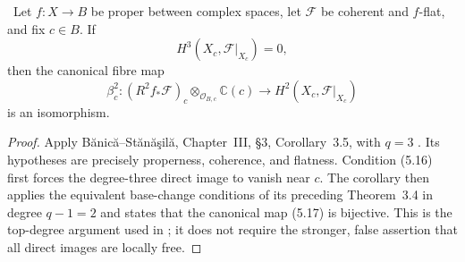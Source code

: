 \begin{proposition}
\label{prop:analytic-base-change}
\Verified\ Let $f:X\to B$ be proper between complex spaces, let
$\mathcal F$ be coherent and $f$-flat, and fix $c\in B$.  If
\[
H^3(X_c,\mathcal F|_{X_c})=0,
\tag{5.16}
\]
then the canonical fibre map
\[
\beta_c^2:
(R^2f_*\mathcal F)_c\otimes_{\mathcal O_{B,c}}\mathbb C(c)
\longrightarrow H^2(X_c,\mathcal F|_{X_c})
\tag{5.17}
\]
is an isomorphism.
\end{proposition}

\begin{proof}
Apply B\u{a}nic\u{a}--St\u{a}n\u{a}\c{s}il\u{a},
Chapter~III, \S3, Corollary~3.5, with $q=3$
\cite[pp.~120--121]{BanicaStanasila1976}.  Its hypotheses are precisely
properness, coherence, and flatness.  Condition (5.16) first forces the
degree-three direct image to vanish near $c$.  The corollary then applies the
equivalent base-change conditions of its preceding Theorem~3.4 in degree
$q-1=2$ and states that the canonical map (5.17) is bijective.  This is the
top-degree argument used in \cite[Lemma~1.5]{CDP1998}; it does not require
the stronger, false assertion that all direct images are locally free.
\end{proof}


